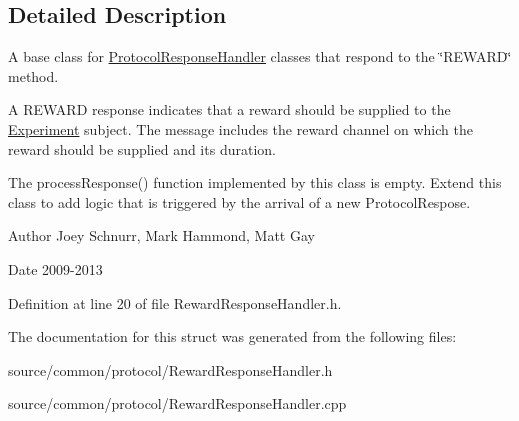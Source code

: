 \subsection{Detailed Description}
A base class for \hyperlink{struct_picto_1_1_protocol_response_handler}{Protocol\-Response\-Handler} classes that respond to the \char`\"{}\-R\-E\-W\-A\-R\-D\char`\"{} method. 

A R\-E\-W\-A\-R\-D response indicates that a reward should be supplied to the \hyperlink{class_picto_1_1_experiment}{Experiment} subject. The message includes the reward channel on which the reward should be supplied and its duration.

The process\-Response() function implemented by this class is empty. Extend this class to add logic that is triggered by the arrival of a new Protocol\-Respose. \begin{DoxyAuthor}{Author}
Joey Schnurr, Mark Hammond, Matt Gay 
\end{DoxyAuthor}
\begin{DoxyDate}{Date}
2009-\/2013 
\end{DoxyDate}


Definition at line 20 of file Reward\-Response\-Handler.\-h.



The documentation for this struct was generated from the following files\-:\begin{DoxyCompactItemize}
\item 
source/common/protocol/Reward\-Response\-Handler.\-h\item 
source/common/protocol/Reward\-Response\-Handler.\-cpp\end{DoxyCompactItemize}

